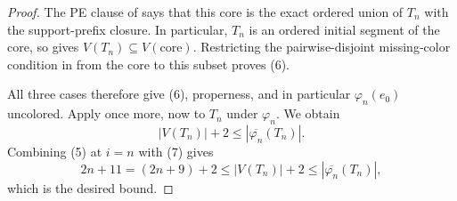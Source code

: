 \begin{proof}
The PE clause of  says that this core is the exact
ordered union of $T_n$ with the support-prefix closure.  In particular,
$T_n$ is an ordered initial segment of the core, so
 gives
$V(T_n)\subseteq V(\text{core})$.  Restricting the pairwise-disjoint
missing-color condition in  from the
core to this subset proves (6).

All three cases therefore give (6), properness, and in particular
$\varphi_n(e_0)$ uncolored.  Apply
 once more, now to $T_n$ under
$\varphi_n$.  We obtain
\[
 |V(T_n)|+2\leq|\overline{\varphi_n}(T_n)|.                   \tag{7}
\]
Combining (5) at $i=n$ with (7) gives
\[
 2n+11=(2n+9)+2
   \leq |V(T_n)|+2
   \leq |\overline{\varphi_n}(T_n)|,
\]
which is the desired bound.
\end{proof}
